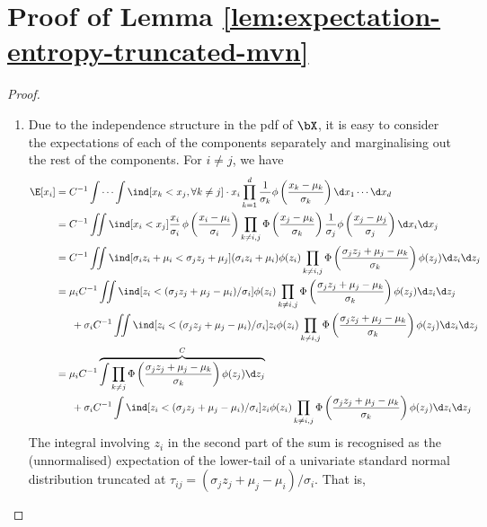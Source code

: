 \section{Proof of Lemma \ref{lem:expectation-entropy-truncated-mvn}}

\begin{proof}
\begin{enumerate}[label=(\roman*)]
  \item Due to the independence structure in the pdf of $\bX$, it is easy to consider the expectations of each of the components separately and marginalising out the rest of the components. For $i \neq j$, we have
  \begin{align*}
    \E[x_i] 
    &= C^{-1} \idotsint \ind[x_k < x_j, \forall k \neq j] \cdot x_i  \prod_{k=1}^d \frac{1}{\sigma_k}\phi \left( \frac{x_k - \mu_k}{\sigma_k} \right) \d x_1 \cdots \d x_d \\
    &= C^{-1} \iint \ind[x_i < x_j] \frac{x_i}{\sigma_i} \, \phi \left( \frac{x_i - \mu_i}{\sigma_i} \right)  \prod_{k \neq i,j} \Phi \left( \frac{x_j - \mu_k}{\sigma_k} \right) \frac{1}{\sigma_j}\phi \left( \frac{x_j - \mu_j}{\sigma_j} \right) \d x_i \d x_j \\
    &= C^{-1} \iint \ind[\sigma_i z_i + \mu_i < \sigma_j z_j + \mu_j] (\sigma_i z_i + \mu_i) \phi (z_i)  \prod_{k \neq i,j} \Phi \left( \frac{\sigma_j z_j + \mu_j - \mu_k}{\sigma_k} \right) \phi (z_j) \d z_i \d z_j \\
    &= \mu_i C^{-1} \iint \ind[ z_i < (\sigma_j z_j + \mu_j - \mu_i) / \sigma_i] \phi (z_i)  \prod_{k \neq i,j} \Phi \left( \frac{\sigma_j z_j + \mu_j - \mu_k}{\sigma_k} \right) \phi (z_j) \d z_i \d z_j \\*    
    &\phantom{==} + \sigma_i C^{-1} \iint \ind[z_i < (\sigma_j z_j + \mu_j - \mu_i) / \sigma_i] z_i \phi (z_i)  \prod_{k \neq i,j} \Phi \left( \frac{\sigma_j z_j + \mu_j - \mu_k}{\sigma_k} \right) \phi (z_j) \d z_i \d z_j \\
    &= \mu_i C^{-1} 
    \overbrace{
    \int  \prod_{k \neq j} \Phi \left( \frac{\sigma_j z_j + \mu_j - \mu_k}{\sigma_k} \right) \phi (z_j) \d z_j
    }^{C} \\  
    &\phantom{==} + \sigma_i C^{-1} \int \ind[ z_i < (\sigma_j z_j + \mu_j - \mu_i) / \sigma_i] z_i \phi (z_i) \prod_{k \neq i,j} \Phi \left( \frac{\sigma_j z_j + \mu_j - \mu_k}{\sigma_k} \right) \phi (z_j) \d z_i \d z_j \\
  \end{align*}
  The integral involving $z_i$ in the second part of the sum is recognised as the (unnormalised) expectation of the lower-tail of a univariate standard normal distribution truncated at $\tau_{ij} = (\sigma_j z_j + \mu_j - \mu_i) / \sigma_i$. That is,

\end{enumerate}
\end{proof}
